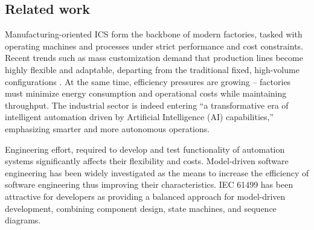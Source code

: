\begin{bibunit}
    
    
    \section{Related work}
    \label{sec:background}
    
    Manufacturing-oriented ICS form the backbone of modern factories, tasked with operating machines and processes under strict performance and cost constraints. Recent trends such as mass customization demand that production lines become highly flexible and adaptable, departing from the traditional fixed, high-volume configurations \cite{9576342}. At the same time, efficiency pressures are growing – factories must minimize energy consumption and operational costs while maintaining throughput. The industrial sector is indeed entering “a transformative era of intelligent automation driven by Artificial Intelligence (AI) capabilities,” emphasizing smarter and more autonomous operations\cite{10677409}. 
    
    Engineering effort, required to develop and test functionality of automation systems significantly affects their flexibility and costs. Model-driven software engineering has been widely investigated as the means to increase the efficiency of software engineering thus improving their characteristics. IEC 61499 has been attractive for developers as providing a balanced approach for model-driven development, combining component design, state machines, and sequence diagrams.
    

\end{bibunit}
